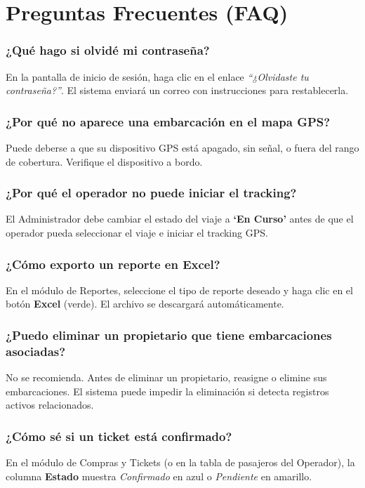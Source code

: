 \documentclass[12pt,a4paper]{article}
\begin{document}
\section{Preguntas Frecuentes (FAQ)}

\subsubsection*{¿Qué hago si olvidé mi contraseña?}
En la pantalla de inicio de sesión, haga clic en el enlace \textit{``¿Olvidaste tu contraseña?''}. El sistema enviará un correo con instrucciones para restablecerla.

\subsubsection*{¿Por qué no aparece una embarcación en el mapa GPS?}
Puede deberse a que su dispositivo GPS está apagado, sin señal, o fuera del rango de cobertura. Verifique el dispositivo a bordo.

\subsubsection*{¿Por qué el operador no puede iniciar el tracking?}
El Administrador debe cambiar el estado del viaje a \textbf{`En Curso'} antes de que el operador pueda seleccionar el viaje e iniciar el tracking GPS.

\subsubsection*{¿Cómo exporto un reporte en Excel?}
En el módulo de Reportes, seleccione el tipo de reporte deseado y haga clic en el botón \textbf{Excel} (verde). El archivo se descargará automáticamente.

\subsubsection*{¿Puedo eliminar un propietario que tiene embarcaciones asociadas?}
No se recomienda. Antes de eliminar un propietario, reasigne o elimine sus embarcaciones. El sistema puede impedir la eliminación si detecta registros activos relacionados.

\subsubsection*{¿Cómo sé si un ticket está confirmado?}
En el módulo de Compras y Tickets (o en la tabla de pasajeros del Operador), la columna \textbf{Estado} muestra \textit{Confirmado} en azul o \textit{Pendiente} en amarillo.
\end{document}
